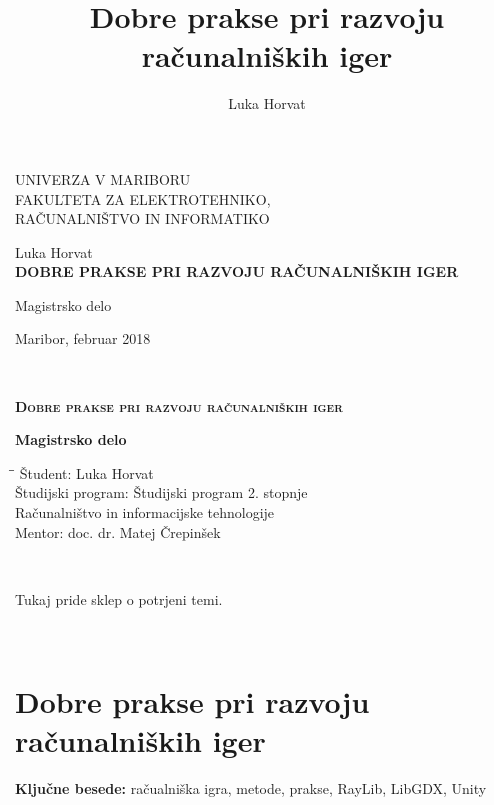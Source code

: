 \documentclass[12pt,a4paper,twoside]{book}
\author{Luka Horvat}
\title{Dobre prakse pri razvoju računalniških iger}
\begin{document}
	
\thispagestyle{empty} 
\begin{center}
	{\large 
		UNIVERZA V MARIBORU\\
		FAKULTETA ZA ELEKTROTEHNIKO,\\
		RAČUNALNIŠTVO IN INFORMATIKO\\
	}
	
	\vspace{\fill}
	{\LARGE Luka Horvat}\\
	
	\vspace{1cm}
	\textsc{\textbf{\LARGE DOBRE PRAKSE PRI RAZVOJU RAČUNALNIŠKIH IGER\\}}
	
	\vspace{1cm}
	{\LARGE Magistrsko delo}
	
	\vfill
	{\Large Maribor, februar 2018}
	\newpage
\end{center}

\ \thispagestyle{empty}
\newpage

\thispagestyle{empty} 
\begin{center}	
	\vspace*{\fill}
	\textsc{\textbf{\LARGE
			Dobre prakse pri razvoju računalniških iger\\
	}}
	{\large\textbf{Magistrsko delo\\}
		
	}
	\vspace{\fill}
	\begin{tabbing}
		\hspace*{4cm}\=\hspace*{3cm}\= \kill
		Študent: \> Luka Horvat\\
		Študijski program: \> Študijski program 2. stopnje\\
		\>Računalništvo in informacijske tehnologije\\
		Mentor: \> doc. dr. Matej Črepinšek
	\end{tabbing}
\end{center}
\newpage

\ \thispagestyle{empty}
\newpage

\thispagestyle{empty}
Tukaj pride sklep o potrjeni temi.
\newpage

\ \thispagestyle{empty}
\newpage

\chapter*{Dobre prakse pri razvoju računalniških iger}\thispagestyle{fancy}
\setcounter{page}{1}
\textbf{Ključne besede:} račualniška igra, metode, prakse, RayLib, LibGDX, Unity
\end{document}
